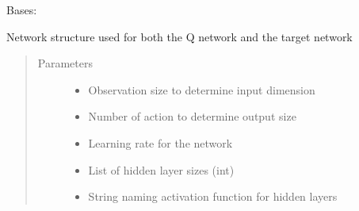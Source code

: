 \documentclass[letterpaper,10pt,english]{sphinxmanual}
\begin{document}
\begin{fulllineitems}
\label{\detokenize{agents.reinforcement_learning:agents.reinforcement_learning.dqn.Policy}}
\sphinxAtStartPar
Bases: 

\sphinxAtStartPar
Network structure used for both the Q network and the target network
\begin{quote}\begin{description}
\item[{Parameters}] \leavevmode\begin{itemize}
\item {} 
\sphinxAtStartPar
{} \textendash{} Observation size to determine input dimension

\item {} 
\sphinxAtStartPar
{} \textendash{} Number of action to determine output size

\item {} 
\sphinxAtStartPar
{} \textendash{} Learning rate for the network

\item {} 
\sphinxAtStartPar
{} \textendash{} List of hidden layer sizes (int)

\item {} 
\sphinxAtStartPar
{} \textendash{} String naming activation function for hidden layers

\end{itemize}

\end{description}\end{quote}


\end{fulllineitems}
\end{document}
